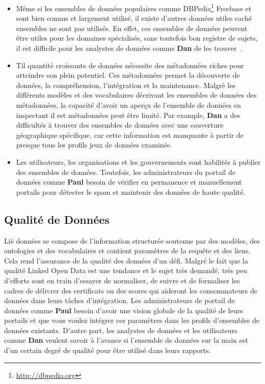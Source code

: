 \documentclass[a4paper,11pt,twoside]{ThesisStyle}
\begin{document}
\begin{itemize}
	\item Même si les ensembles de données populaires comme DBPedia\footnote{\url{http://dbpedia.org}} Freebase et sont bien connus et largement utilisé, il existe d'autres données utiles caché ensembles ne sont pas utilisés. En effet, ces ensembles de données peuvent être utiles pour les domaines spécialisés, sans toutefois bon registre de sujets, il est difficile pour les analystes de données comme \textbf{Dan} de les trouver~\cite{Lalithsena:WI:13}.
	\item Til quantité croissante de données nécessite des métadonnées riches pour atteindre son plein potentiel. Ces métadonnées permet la découverte de données, la compréhension, l'intégration et la maintenance. Malgré les différents modèles et des vocabulaires décrivant les ensembles de données des métadonnées, la capacité d'avoir un aperçu de l'ensemble de données en inspectant il est métadonnées peut être limité. Par example, \textbf{Dan} a des difficultés à trouver des ensembles de données avec une couverture géographique spécifique, car cette information est manquante à partir de presque tous les profils jeux de données examinés.
	\item Les utilisateurs, les organisations et les gouvernements sont habilités à publier des ensembles de données. Toutefois, les administrateurs du portail de données comme \textbf{Paul} besoin de vérifier en permanence et manuellement portails pour détecter le spam et maintenir des données de haute qualité.
\end{itemize}

\subsection{Qualité de Données}

Lié données se compose de l'information structurée soutenue par des modèles, des ontologies et des vocabulaires et contient paramètres de la requête et des liens. Cela rend l'assurance de la qualité des données d'un défi. Malgré le fait que la qualité Linked Open Data est une tendance et le sujet très demandé, très peu d'efforts sont en train d'essayer de normaliser, de suivre et de formaliser les cadres de délivrer des certificats ou des scores qui aideront les consommateurs de données dans leurs tâches d'intégration. Les administrateurs de portail de données comme \textbf{Paul} besoin d'avoir une vision globale de la qualité de leurs portails et que vous voulez intégrer ces paramètres dans les profils d'ensembles de données existants. D'autre part, les analystes de données et les utilisateurs comme \textbf{Dan} veulent savoir à l'avance si l'ensemble de données sur la main est d'un certain degré de qualité pour être utilisé dans leurs rapports.
\end{document}
